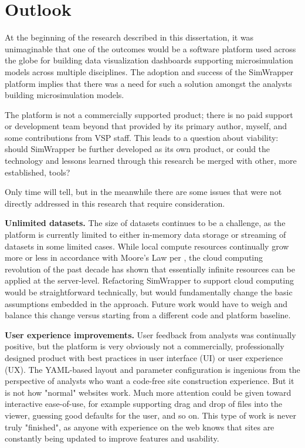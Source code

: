 \section{Outlook}
\label{08-conclusions-outlook}

At the beginning of the research described in this dissertation, it was unimaginable that one of the outcomes would be a software platform used across the globe for building data visualization dashboards supporting microsimulation models across multiple disciplines. The adoption and success of the SimWrapper platform implies that there was a need for such a solution amongst the analysts building microsimulation models.

The platform is not a commercially supported product; there is no paid support or development team beyond that provided by its primary author, myself, and some contributions from VSP staff. This leads to a question about viability: should SimWrapper be further developed as its own product, or could the technology and lessons learned through this research be merged with other, more established, tools?

Only time will tell, but in the meanwhile there are some issues that were not directly addressed in this research that require consideration.

\textbf{Unlimited datasets.} The size of datasets continues to be a challenge, as the platform is currently limited to either in-memory data storage or streaming of datasets in some limited cases. While local compute resources continually grow more or less in accordance with Moore's Law per \cite{Schaller1997MooresLaw}, the cloud computing revolution of the past decade has shown that essentially infinite resources can be applied at the server-level. Refactoring SimWrapper to support cloud computing would be straightforward technically, but would fundamentally change the basic assumptions embedded in the approach. Future work would have to weigh and balance this change versus starting from a different code and platform baseline.

\textbf{User experience improvements.} User feedback from analysts was continually positive, but the platform is very obviously not a commercially, professionally designed product with best practices in user interface (UI) or user experience (UX). The YAML-based layout and parameter configuration is ingenious from the perspective of analysts who want a code-free site construction experience. But it is not how "normal" websites work. Much more attention could be given toward interactive ease-of-use, for example supporting drag and drop of files into the viewer, guessing good defaults for the user, and so on. This type of work is never truly "finished", as anyone with experience on the web knows that sites are constantly being updated to improve features and usability.

